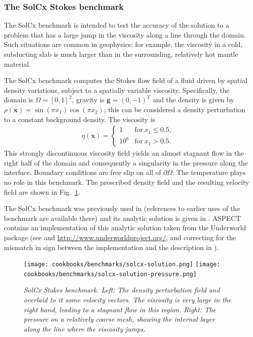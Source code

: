 \documentclass{article}
\newcommand{\aspect}{\textsc{ASPECT}}
\begin{document}
\subsubsection{The SolCx Stokes benchmark}
\label{sec:benchmark-solcx}

The SolCx benchmark is intended to test the accuracy of the solution to a
problem that has a large jump in the viscosity along a line through the
domain. Such situations are common in geophysics: for example, the viscosity
in a cold, subducting slab is much larger than in the surrounding, relatively
hot mantle material.

The SolCx benchmark computes the Stokes flow field of a fluid driven by
spatial density variations, subject to a spatially variable
viscosity. Specifically, the domain is $\Omega=[0,1]^2$, gravity is $\mathbf
g=(0,-1)^T$ and the density is given
by $\rho(\mathbf x)=\sin(\pi x_1)\cos(\pi x_2)$; this can be considered a
density perturbation to a constant background density. The viscosity is
\begin{align*}
  \eta(\mathbf x) = \left\{
    \begin{matrix}
      1 & \text{for}\ x_1 \le 0.5, \\
      10^6 & \text{for}\ x_1  > 0.5.
    \end{matrix}
  \right.
\end{align*}
This strongly discontinuous viscosity field yields an almost stagnant flow in
the right half of the domain and consequently a singularity in the pressure
along the interface.
Boundary conditions are free slip on all of $\partial\Omega$. The temperature
plays no role in this benchmark. The prescribed density field and the
resulting velocity field are shown in Fig.~\ref{fig:solcx}.

The SolCx benchmark was previously used in \cite[Section 4.1.1]{DMGT11}
(references to earlier uses of the benchmark are available there) and its analytic
solution is given in \cite{Zho96}. \aspect{} contains an implementation of
this analytic solution taken from the Underworld package (see \cite{MQLMAM07}
and \url{http://www.underworldproject.org/}, and correcting for the mismatch
in sign between the implementation and the description in \cite{DMGT11}).

\begin{figure}
  \begin{center}
    \texttt{[image: cookbooks/benchmarks/solcx-solution.png]}
    \hfill
    \texttt{[image: cookbooks/benchmarks/solcx-solution-pressure.png]}
    \caption{\it SolCx Stokes benchmark. Left: The density perturbation field
    and overlaid to it some velocity vectors. The viscosity is very large in the
      right hand, leading to a stagnant flow in this region. Right: The
      pressure on a relatively coarse mesh, showing the internal layer along
      the line where the viscosity jumps.}
    \label{fig:solcx}
  \end{center}
\end{figure}
\end{document}
